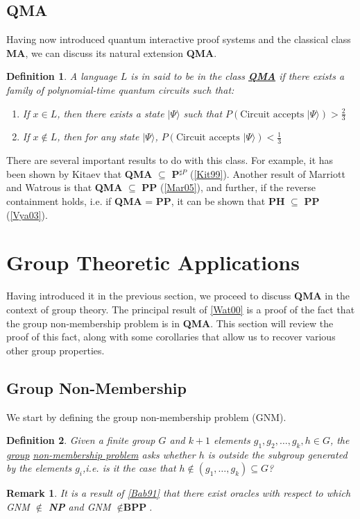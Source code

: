\documentclass[12pt]{article}
\newtheorem{defn}{Definition}
\newtheorem{rmk}{Remark}
\numberwithin{thm}{section}
\numberwithin{defn}{section}
\numberwithin{prop}{section}
\numberwithin{rmk}{section}
\newcommand{\ket}[1]{\vert #1 \rangle}
\begin{document}
	\subsection{QMA}
	Having now introduced quantum interactive proof systems and the classical class \textbf{MA}, we can discuss its natural extension \textbf{QMA}.
	\begin{defn}
		A language $L$ is in said to be in the class \underline{\textbf{QMA}} if there exists a family of polynomial-time quantum circuits such that:
		\begin{enumerate}[label=(\roman*)]
			\item If $x\in L$, then there exists a state $\ket{\Psi}$ such that $P(\text{Circuit accepts } \ket{\Psi})>\frac{2}{3}$
			\item If $x\notin L$, then for any state $\ket{\Psi}$, $P(\text{Circuit accepts } \ket{\Psi})<\frac{1}{3}$
		\end{enumerate}
	\end{defn}
	 There are several important results to do with this class. For example, it has been shown by Kitaev that \textbf{QMA} $\subseteq$ \textbf{P$^{\sharp P}$} (\hyperref[kit99]{[Kit99]}). Another result of Marriott and Watrous is that \textbf{QMA} $\subseteq$ \textbf{PP} (\hyperref[mar05]{[Mar05]}), and further, if the reverse containment holds, i.e. if \textbf{QMA} = \textbf{PP}, it can be shown that \textbf{PH} $\subseteq$ \textbf{PP} (\hyperref[vya03]{[Vya03]}).
    \section{Group Theoretic Applications}
    Having introduced it in the previous section, we proceed to discuss \textbf{QMA} in the context of group theory. The principal result of \hyperref[wat00]{[Wat00]} is a proof of the fact that the group non-membership problem is in \textbf{QMA}. This section will review the proof of this fact, along with some corollaries that allow us to recover various other group properties. 
    \subsection{Group Non-Membership}
    We start by defining the group non-membership problem (GNM).
    \begin{defn}
    	Given a finite group $G$ and $k+1$ elements $g_1,g_2,\dots,g_k,h\in G$, the \underline{group} \underline{non-membership problem} asks whether $h$ is outside the subgroup generated by the elements $g_i$,i.e. is it the case that $h\notin (g_1,\dots,g_k)\subseteq G$?
    \end{defn}
	\begin{rmk}
	It is a result of \hyperref[bab91]{[Bab91]} that there exist oracles with respect to which GNM $\notin$ \textbf{NP} and GNM $\notin\textbf{BPP}$.
	\end{rmk}
	
\end{document}

